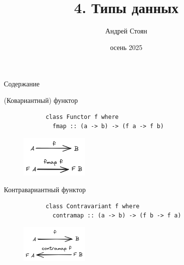 
\newif\ifhandout



\newcommand{\iso}{\sim}

\title{4. Типы данных}
\author{Андрей Стоян}

\date{осень 2025}



    \mymaketitle

    \begin{frame}[noframenumbering]{Содержание}
        \tableofcontents
    \end{frame}


    \begin{frame}[fragile]{(Ковариантный) функтор}
        \pause
        \begin{verbatim}
            class Functor f where
              fmap :: (a -> b) -> (f a -> f b)
        \end{verbatim}
        \vspace{1em}
        \begin{figure}[H]
            \centering
            \includegraphics[width=0.3\textwidth]{figs/functor}
        \end{figure}
    \end{frame}

    \begin{frame}[fragile]{Контравариантный функтор}
        \pause
        \begin{verbatim}
            class Contravariant f where
              contramap :: (a -> b) -> (f b -> f a)
        \end{verbatim}
        \vspace{1em}
        \begin{figure}[H]
            \centering
            \includegraphics[width=0.3\textwidth]{figs/contra-functor}
        \end{figure}
    \end{frame}

